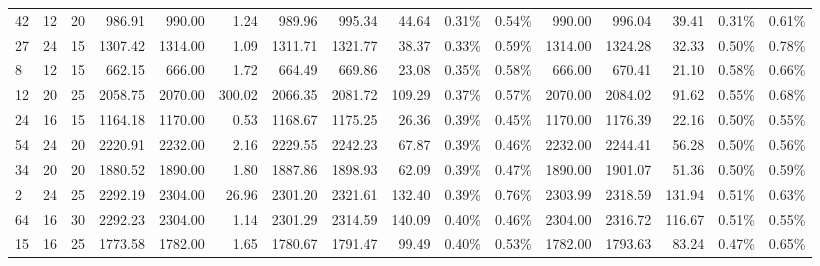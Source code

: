 \begin{tabular}{lllrrrrrrllrrrll}
42 &  12 &  20 &    986.91 &     990.00 &        1.24 &        989.96 &         995.34 &           44.64 &            0.31\% &             0.54\% &        990.00 &         996.04 &           39.41 &            0.31\% &             0.61\% \\
27 &  24 &  15 &   1307.42 &    1314.00 &        1.09 &       1311.71 &        1321.77 &           38.37 &            0.33\% &             0.59\% &       1314.00 &        1324.28 &           32.33 &            0.50\% &             0.78\% \\
8  &  12 &  15 &    662.15 &     666.00 &        1.72 &        664.49 &         669.86 &           23.08 &            0.35\% &             0.58\% &        666.00 &         670.41 &           21.10 &            0.58\% &             0.66\% \\
12 &  20 &  25 &   2058.75 &    2070.00 &      300.02 &       2066.35 &        2081.72 &          109.29 &            0.37\% &             0.57\% &       2070.00 &        2084.02 &           91.62 &            0.55\% &             0.68\% \\
24 &  16 &  15 &   1164.18 &    1170.00 &        0.53 &       1168.67 &        1175.25 &           26.36 &            0.39\% &             0.45\% &       1170.00 &        1176.39 &           22.16 &            0.50\% &             0.55\% \\
54 &  24 &  20 &   2220.91 &    2232.00 &        2.16 &       2229.55 &        2242.23 &           67.87 &            0.39\% &             0.46\% &       2232.00 &        2244.41 &           56.28 &            0.50\% &             0.56\% \\
34 &  20 &  20 &   1880.52 &    1890.00 &        1.80 &       1887.86 &        1898.93 &           62.09 &            0.39\% &             0.47\% &       1890.00 &        1901.07 &           51.36 &            0.50\% &             0.59\% \\
2  &  24 &  25 &   2292.19 &    2304.00 &       26.96 &       2301.20 &        2321.61 &          132.40 &            0.39\% &             0.76\% &       2303.99 &        2318.59 &          131.94 &            0.51\% &             0.63\% \\
64 &  16 &  30 &   2292.23 &    2304.00 &        1.14 &       2301.29 &        2314.59 &          140.09 &            0.40\% &             0.46\% &       2304.00 &        2316.72 &          116.67 &            0.51\% &             0.55\% \\
15 &  16 &  25 &   1773.58 &    1782.00 &        1.65 &       1780.67 &        1791.47 &           99.49 &            0.40\% &             0.53\% &       1782.00 &        1793.63 &           83.24 &            0.47\% &             0.65\% \\

\end{tabular}
